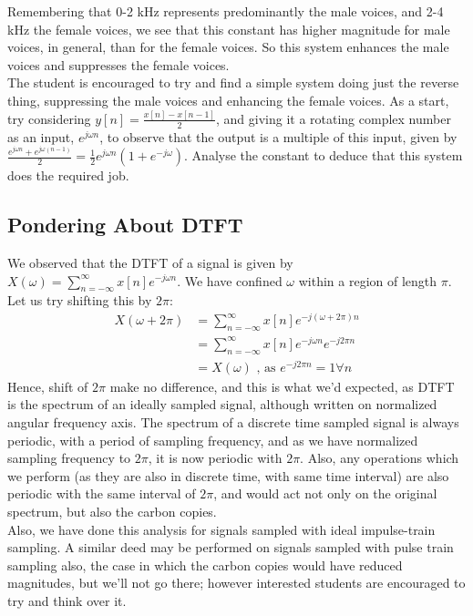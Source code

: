Remembering that 0-2 kHz represents predominantly the male voices, and 2-4 kHz the female voices, we see that this constant has higher magnitude for male voices, in general, than for the female voices. So this system enhances the male voices and suppresses the female voices.\\
The student is encouraged to try and find a simple system doing just the reverse thing, suppressing the male voices and enhancing the female voices. As a start, try considering $y[n]=\frac{x[n]-x[n-1]}{2}$, and giving it a rotating complex number as an input, $e^{j\omega n}$, to observe that the output is a multiple of this input, given by $\frac{e^{j\omega n}+e^{j\omega (n-1)}}{2}=\frac{1}{2}e^{j\omega n}\left(1+e^{-j\omega}\right)$. Analyse the constant to deduce that this system does the required job.

\subsection{Pondering About DTFT}
We observed that the DTFT of a signal is given by $X(\omega)=\sum\limits_{n=-\infty}^{\infty}x[n]e^{-j\omega n}$. We have confined $\omega$ within a region of length $\pi$. Let us try shifting this by $2\pi$:
\begin{align*}
X(\omega+2\pi)&=\sum\limits_{n=-\infty}^{\infty}x[n]e^{-j(\omega+2\pi) n}\\
&=\sum\limits_{n=-\infty}^{\infty}x[n]e^{-j\omega n}e^{-j2\pi n}\\
&=X(\omega)\text{  , as   }e^{-j2\pi n}=1\forall n
\end{align*}
Hence, shift of $2\pi$ make no difference, and this is what we'd expected, as DTFT is the spectrum of an ideally sampled signal, although written on normalized angular frequency axis. The spectrum of a discrete time sampled signal is always periodic, with a period of sampling frequency, and as we have normalized sampling frequency to $2\pi$, it is now periodic with $2\pi$. Also, any operations which we perform (as they are also in discrete time, with same time interval) are also periodic with the same interval of $2\pi$, and would act not only on the original spectrum, but also the carbon copies.\\
Also, we have done this analysis for signals sampled with ideal impulse-train sampling. A similar deed may be performed on signals sampled with pulse train sampling also, the case in which the carbon copies would have reduced magnitudes, but we'll not go there; however interested students are encouraged to try and think over it.




